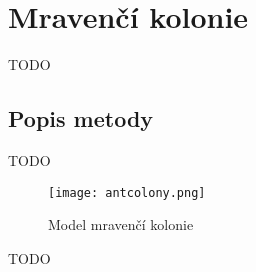 \section{Mravenčí kolonie}
TODO
\subsection{Popis metody}
TODO

\begin{figure}[H]
	\texttt{[image: antcolony.png]}
	\centering
	\caption{Model mravenčí kolonie}
\end{figure}

TODO